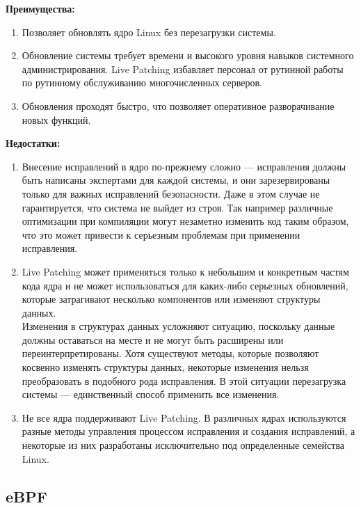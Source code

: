 \textbf{Преимущества:}

\begin{enumerate}
    \item Позволяет обновлять ядро Linux без перезагрузки системы.
    \item Обновление системы требует времени и высокого уровня навыков системного администрирования.
    Live Patching избавляет персонал от рутинной работы по рутинному обслуживанию многочисленных серверов.
    \item Обновления проходят быстро, что позволяет оперативное разворачивание новых функций.
\end{enumerate}

\textbf{Недостатки:}

\begin{enumerate}
    \item Внесение исправлений в ядро по-прежнему сложно — исправления должны быть написаны экспертами для каждой системы,
    и они зарезервированы только для важных исправлений безопасности.
    Даже в этом случае не гарантируется, что система не выйдет из строя.
    Так например различные оптимизации при компиляции могут незаметно изменить код таким образом, что это может привести к серьезным проблемам при применении исправления.\cite{livepatch-problems}
    \item Live Patching может применяться только к небольшим и конкретным частям кода ядра и не может использоваться для каких-либо серьезных обновлений,
    которые затрагивают несколько компонентов или изменяют структуры данных.
    \vspace{0.5cm}\\
    Изменения в структурах данных усложняют ситуацию, поскольку данные должны оставаться на месте и не могут быть расширены или переинтерпретированы.
    Хотя существуют методы, которые позволяют косвенно изменять структуры данных, некоторые изменения нельзя преобразовать в подобного рода исправления.
    В этой ситуации перезагрузка системы — единственный способ применить все изменения.
    \item Не все ядра поддерживают Live Patching.
    В различных ядрах используются разные методы управления процессом исправления и создания исправлений,
    а некоторые из них разработаны исключительно под определенные семейства Linux.\cite{infosec}
\end{enumerate}

\subsection{eBPF}\label{subsec:ebpf}

